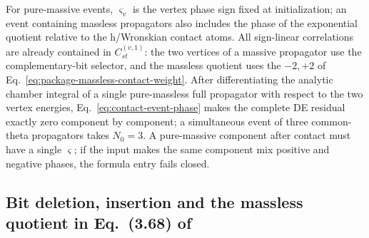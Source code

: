 \documentclass[11pt,a4paper]{article}
\begin{document}
For pure-massive events, $\varsigma_v$ is the vertex phase sign fixed at initialization; an event containing massless propagators also includes the phase of the exponential quotient relative to the h/Wronskian contact atoms. All sign-linear correlations are already contained in $C_{st}^{(v,1)}$: the two vertices of a massive propagator use the complementary-bit selector, and the massless quotient uses the $-2,+2$ of Eq.~\eqref{eq:package-massless-contact-weight}. After differentiating the analytic chamber integral of a single pure-massless full propagator with respect to the two vertex energies, Eq.~\eqref{eq:contact-event-phase} makes the complete DE residual exactly zero component by component; a simultaneous event of three common-theta propagators takes $N_0=3$. A pure-massive component after contact must have a single $\varsigma$; if the input makes the same component mix positive and negative phases, the formula entry fails closed.

\subsection{Bit deletion, insertion and the massless quotient in Eq.~(3.68) of \texorpdfstring{\cite{Chen:2023eic}}{arXiv:2401.00129}}
\end{document}
